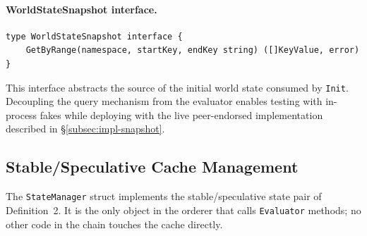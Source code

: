 \paragraph{WorldStateSnapshot interface.}
\begin{verbatim}
type WorldStateSnapshot interface {
    GetByRange(namespace, startKey, endKey string) ([]KeyValue, error)
}
\end{verbatim}
This interface abstracts the source of the initial world state consumed by
\texttt{Init}.  Decoupling the query mechanism from the evaluator enables
testing with in-process fakes while deploying with the live peer-endorsed
implementation described in \S\ref{subsec:impl-snapshot}.

\subsection{Stable/Speculative Cache Management}
\label{subsec:impl-cache}

The \texttt{StateManager} struct implements the stable/speculative state pair
of Definition~2.  It is the only object in the orderer that calls
\texttt{Evaluator} methods; no other code in the chain touches the cache
directly.

